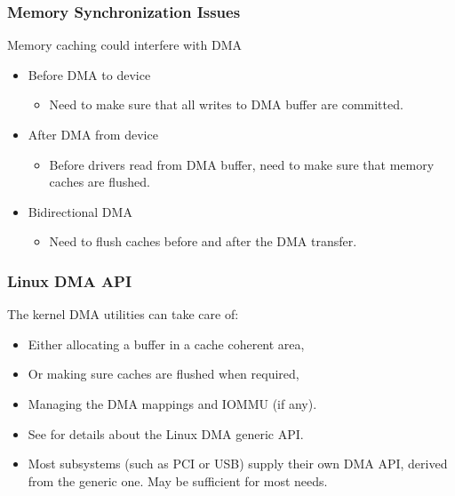 \begin{frame}
  \frametitle{Memory Synchronization Issues}
  Memory caching could interfere with DMA
  \begin{itemize}
  \item Before DMA to device
    \begin{itemize}
    \item Need to make sure that all writes to DMA buffer are
      committed.
    \end{itemize}
  \item After DMA from device
    \begin{itemize}
    \item Before drivers read from DMA buffer, need to make sure
      that memory caches are flushed.
    \end{itemize}
  \item Bidirectional DMA
    \begin{itemize}
    \item Need to flush caches before and after the DMA transfer.
    \end{itemize}
  \end{itemize}
\end{frame}

\begin{frame}
  \frametitle{Linux DMA API}
  The kernel DMA utilities can take care of:
  \begin{itemize}
  \item Either allocating a buffer in a cache coherent area,
  \item Or making sure caches are flushed when required,
  \item Managing the DMA mappings and IOMMU (if any).
  \item See  for details about the
    Linux DMA generic API.
  \item Most subsystems (such as PCI or USB) supply their own DMA
    API, derived from the generic one. May be sufficient for most
    needs.
  \end{itemize}
\end{frame}

